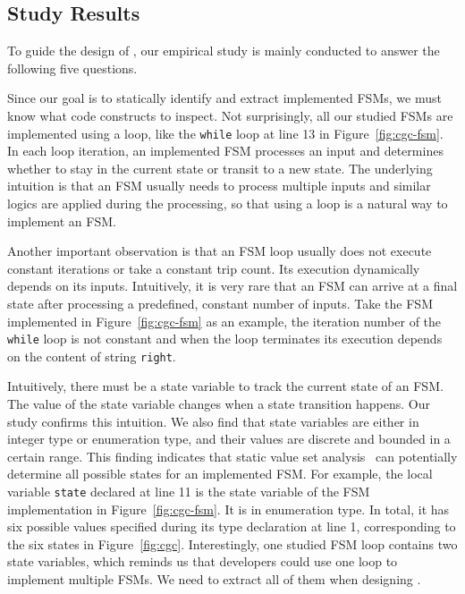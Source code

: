 


\subsection{Study Results}
To guide the design of \Tool{}, our empirical study
is mainly conducted to answer the following five questions. 



Since our goal is to statically identify and extract implemented FSMs,
we must know what code constructs to inspect.
Not surprisingly, all our studied FSMs are implemented using a loop,
like the \texttt{while} loop at line 13 in Figure~\ref{fig:cgc-fsm}.
In each loop iteration, an implemented FSM processes an input and
determines whether to stay in the current state or transit to a new state.
The underlying intuition is that an FSM usually needs to process
multiple inputs and similar logics are applied during the processing,
so that using a loop is a natural way to implement an FSM.

Another important observation is that
an FSM loop usually does not execute constant
iterations or take a constant trip count.
Its execution dynamically depends on its inputs. 
Intuitively, it is very rare that an FSM can arrive at a final
state after processing a predefined, constant number of inputs.
Take the FSM implemented in Figure~\ref{fig:cgc-fsm} as an example,
the iteration number of the \texttt{while} loop is not constant and
when the loop terminates its execution  
depends on the content of string \texttt{right}.

Intuitively, there must be a state variable to track the current state of an FSM.
The value of the state variable changes when a state transition happens.
Our study confirms this intuition.
We also find that state variables are either in integer type or enumeration type,
and their values are discrete and bounded in a certain range.
This finding indicates that static value set analysis~\cite{DEEPVSA,VSA}
can potentially determine all possible states for an implemented FSM.
For example, the local variable \texttt{state} declared at line 11
is the state variable of the FSM implementation in Figure~\ref{fig:cgc-fsm}.
It is in enumeration type.
In total, it has six possible values
specified during its type declaration at line 1,
corresponding to the six states in Figure~\ref{fig:cgc}.
Interestingly, one studied FSM loop contains two state variables,
which reminds us that developers could use one loop
to implement multiple FSMs.
We need to extract all of them when designing \Tool{}.




